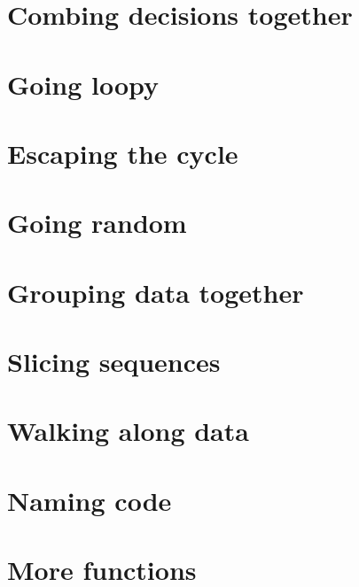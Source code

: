 \documentclass[letterpaper,10pt,english]{sphinxmanual}
\begin{document}
\chapter{Combing decisions together}
\label{10 - Combing decisions together:combing-decisions-together}\label{10 - Combing decisions together::doc}

\chapter{Going loopy}
\label{11 - Going loopy:going-loopy}\label{11 - Going loopy::doc}

\chapter{Escaping the cycle}
\label{12 - Escaping the cycle:escaping-the-cycle}\label{12 - Escaping the cycle::doc}

\chapter{Going random}
\label{13 - Going random:going-random}\label{13 - Going random::doc}

\chapter{Grouping data together}
\label{14 - Grouping data together:grouping-data-together}\label{14 - Grouping data together::doc}

\chapter{Slicing sequences}
\label{15 - Slicing sequences:slicing-sequences}\label{15 - Slicing sequences::doc}

\chapter{Walking along data}
\label{16 - Walking along data:walking-along-data}\label{16 - Walking along data::doc}

\chapter{Naming code}
\label{17 - Naming code::doc}\label{17 - Naming code:naming-code}

\chapter{More functions}
\label{18 - More functions:more-functions}\label{18 - More functions::doc}
\end{document}
